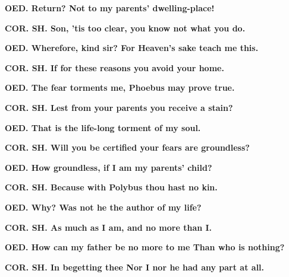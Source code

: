 \documentclass[11pt,letter]{book}
\begin{document}
\par \textbf{OED. Return? Not to my parents’ dwelling-place!}
\par 

\par \textbf{COR. SH. Son, ’tis too clear, you know not what you do.}
\par 

\par \textbf{OED. Wherefore, kind sir? For Heaven’s sake teach me this.}
\par 

\par \textbf{COR. SH. If for these reasons you avoid your home.}
\par 

\par \textbf{OED. The fear torments me, Phoebus may prove true.}
\par 

\par \textbf{COR. SH. Lest from your parents you receive a stain?}
\par 

\par \textbf{OED. That is the life-long torment of my soul.}
\par 

\par \textbf{COR. SH. Will you be certified your fears are groundless?}
\par 

\par \textbf{OED. How groundless, if I am my parents’ child?}
\par 

\par \textbf{COR. SH. Because with Polybus thou hast no kin.}
\par 

\par \textbf{OED. Why? Was not he the author of my life?}
\par 

\par \textbf{COR. SH. As much as I am, and no more than I.}
\par 

\par \textbf{OED. How can my father be no more to me Than who is nothing?}
\par 

\par \textbf{COR. SH. In begetting thee Nor I nor he had any part at all.}
\par 
\end{document}

